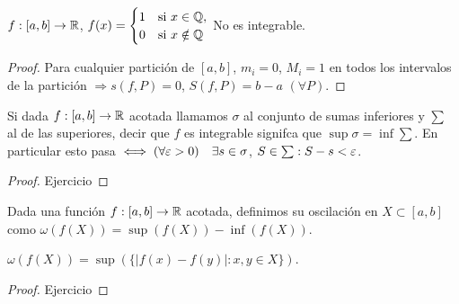 \clearpage

\begin{eg}
  \(f: [a, b] \to \mathbb{R} \), \(f(x) = \begin{cases}
      1 & \text{si } x \in \mathbb{Q},   \\
      0 & \text{si } x \notin \mathbb{Q}
    \end{cases} \)
  No es integrable.
  \begin{proof}
    Para cualquier partición de \([a, b]\), \(m_i = 0\), \(M_i = 1\) en todos los intervalos de la partición \(\Rightarrow s(f, P) = 0\), \(S(f, P) = b-a\) \((\forall P)\).
  \end{proof}
\end{eg}

\begin{note}
  Si dada \(f: [a, b] \to \mathbb{R} \) acotada llamamos \(\sigma \) al conjunto de sumas inferiores y \(\sum \) al de las superiores, decir que \(f\) es integrable signifca que \( \sup \sigma = \inf \sum\).
  En particular esto pasa \(\iff (\forall \varepsilon > 0) \quad \exists s \in \sigma \), \(S \in \sum : S - s < \varepsilon \).
  \begin{proof}
    Ejercicio
  \end{proof}
\end{note}

\begin{definition}[Oscilación]
  Dada una función \(f: [a, b] \to \mathbb{R} \) acotada, definimos su oscilación en \(X \subset [a, b]\) como \(\omega(f(X)) = \sup(f(X)) - \inf(f(X))\).
\end{definition}

\begin{note}
  \(\omega(f(X)) = \sup(\{ |f(x) - f(y)| : x,y \in X \})\).
  \begin{proof}
    Ejercicio
  \end{proof}
\end{note}

\clearpage

